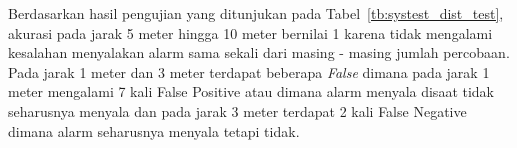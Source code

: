 \par Berdasarkan hasil pengujian yang ditunjukan pada Tabel~\ref{tb:systest_dist_test}, akurasi pada jarak 5 meter hingga 10 meter bernilai 1 karena tidak mengalami kesalahan menyalakan alarm sama sekali dari masing - masing jumlah percobaan. Pada jarak 1 meter dan 3 meter terdapat beberapa \emph{False} dimana pada jarak 1 meter mengalami 7 kali False Positive atau dimana alarm menyala disaat tidak seharusnya menyala dan pada jarak 3 meter terdapat 2 kali False Negative dimana alarm seharusnya menyala tetapi tidak.

